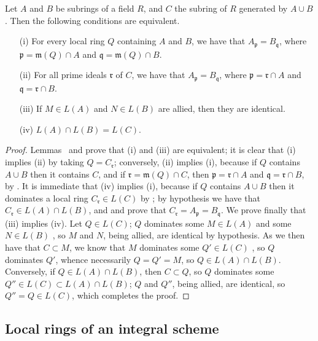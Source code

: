 \begin{proposition}[8.1.5]
\label{I.8.1.5}
Let $A$ and $B$ be subrings of a field $R$, and $C$ the subring of $R$ generated by $A\cup B$.
Then the following conditions are equivalent.
\begin{enumerate}
  \item[{\rm(i)}] For every local ring $Q$ containing $A$ and $B$, we have that $A_\mathfrak{p}=B_\mathfrak{q}$, where $\mathfrak{p}=\mathfrak{m}(Q)\cap A$ and $\mathfrak{q}=\mathfrak{m}(Q)\cap B$.
  \item[{\rm(ii)}] For all prime ideals $\mathfrak{r}$ of $C$, we have that $A_\mathfrak{p}=B_\mathfrak{q}$, where $\mathfrak{p}=\mathfrak{r}\cap A$ and $\mathfrak{q}=\mathfrak{r}\cap B$.
  \item[{\rm(iii)}] If $M\in L(A)$ and $N\in L(B)$ are allied, then they are identical.
  \item[{\rm(iv)}] $L(A)\cap L(B)=L(C)$.
\end{enumerate}
\end{proposition}

\begin{proof}
Lemmas~ and  prove that (i) and (iii) are equivalent;
it is clear that (i) implies (ii) by taking $Q=C_\mathfrak{r}$;
conversely, (ii) implies (i), because if $Q$ contains $A\cup B$ then it contains $C$, and if $\mathfrak{r}=\mathfrak{m}(Q)\cap C$, then $\mathfrak{p}=\mathfrak{r}\cap A$ and $\mathfrak{q}=\mathfrak{r}\cap B$, by .
It is immediate that (iv) implies (i), because if $Q$ contains $A\cup B$ then it dominates a local ring $C_\mathfrak{r}\in L(C)$ by ;
by hypothesis we have that $C_\mathfrak{r}\in L(A)\cap L(B)$, and  and  prove that $C_\mathfrak{r}=A_\mathfrak{p}=B_\mathfrak{q}$.
We prove finally that (iii) implies (iv).
Let $Q\in L(C)$;
$Q$ dominates some $M\in L(A)$ and some $N\in L(B)$ , so $M$ and $N$, being allied, are identical by hypothesis.
As we then have that $C\subset M$, we know that $M$ dominates some $Q'\in L(C)$ , so $Q$ dominates $Q'$, whence necessarily  $Q=Q'=M$, so $Q\in L(A)\cap L(B)$.
Conversely, if $Q\in L(A)\cap L(B)$, then $C\subset Q$, so  $Q$ dominates some $Q''\in L(C)\subset L(A)\cap L(B)$;
$Q$ and $Q''$, being allied, are identical, so $Q''=Q\in L(C)$, which completes the proof.
\end{proof}

\subsection{Local rings of an integral scheme}
\label{subsection:I.8.2}

